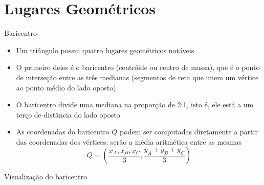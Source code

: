\section{Lugares Geométricos}

\begin{frame}[fragile]{Baricentro}

    \begin{itemize}
        \item Um triângulo possui quatro lugares geométricos notáveis

        \item O primeiro deles é o baricentro (centróide ou centro de massa), que é o ponto de 
            interseção entre as três medianas (segmentos de reta que unem um vértice ao ponto médio do lado oposto)

        \item O baricentro divide uma mediana na proporção de 2:1, isto é, ele está a um terço de 
            distância do lado oposto

        \item As coordenadas do baricentro $Q$ podem ser computadas diretamente a partir das 
            coordenadas dos vértices: serão a média aritmética entre as mesmas
        \[
            Q = \left(\frac{x_A, x_B, x_C}{3}, \frac{y_A + y_B + y_C}{3}\right)
        \]

    \end{itemize}

\end{frame}

\begin{frame}[fragile]{Visualização do baricentro}

    \begin{figure}
        \centering

    \end{figure}

\end{frame}

